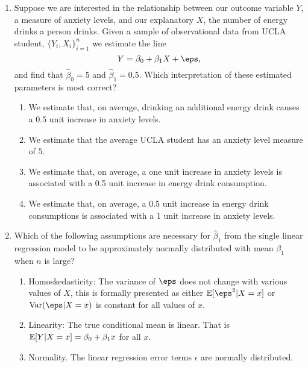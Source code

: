 \documentclass[10pt]{article}
\begin{document}
\begin{enumerate}
	 \item Suppose we are interested in the relationship between our outcome variable \(Y\), a measure of anxiety levels, and our explanatory \(X\), the number of energy drinks a person drinks. Given a sample of observational data from UCLA student,  \(\{Y_i,X_i\}_{i=1}^n\) we estimate the line \[ Y = \beta_0 + \beta_1X + \eps,\] and find that \(\hat\beta_0 = 5\) and  \(\hat\beta_1 = 0.5\). Which interpretation of these estimated parameters is most correct?
	 \begin{enumerate}
		\item We estimate that, on average, drinking an additional energy drink causes a \(0.5\) unit increase  in anxiety levels.
		\item We estimate that the average UCLA student has an anxiety level measure of \(5\).
		\item We estimate that, on average, a one unit increase in anxiety levels is associated with a 0.5 unit increase in energy drink consumption.
		\item We estimate that, on average, a 0.5 unit increase in energy drink consumptions is associated with a 1 unit increase in anxiety levels.
	\end{enumerate}
	 


	\item Which of the following assumptions are necessary for \(\hat\beta_1\) from the single linear regression model to be approximately normally distributed with mean \(\beta_1\) when  \(n\) is large?
	 \begin{enumerate}
		 \item Homoskedasticity: The variance of \(\eps\) does not change with various values of  \(X\),  this is formally presented as either  \(\E[\eps^2|X=x]\) or \(\Var(\eps|X=x)\) is constant for all values of  \(x\).
		 \item Linearity: The true conditional mean is linear. That is \(\mathbb{E}[Y|X=x] = \beta_0 + \beta_1x\) for all \(x\). 
	 	 \item Normality. The linear regression error terms \(\epsilon\) are normally distributed.
	\end{enumerate}
	 


\end{enumerate}
\end{document}
